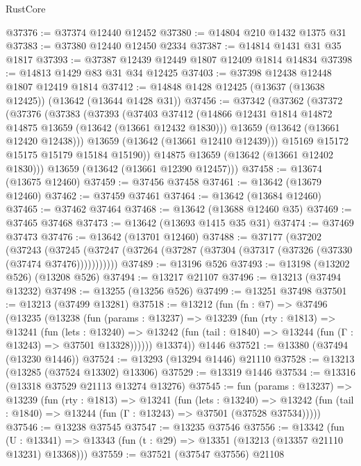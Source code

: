\begin{lexlean}{RustCore}
\begin{coremodule}
@37376 := @37374 @12440 @12452
@37380 := @14804 @210 @1432 @1375 @31
@37383 := @37380 @12440 @12450 @2334
@37387 := @14814 @1431 @31 @35 @1817
@37393 := @37387 @12439 @12449 @1807 @12409 @1814 @14834
@37398 := @14813 @1429 @83 @31 @34 @12425
@37403 := @37398 @12438 @12448 @1807 @12419 @1814
@37412 := @14848 @1428 @12425 (@13637 (@13638 @12425)) (@13642 (@13644 @1428 @31))
@37456 := @37342
    (@37362
      (@37372
        (@37376
          (@37383
            (@37393
              (@37403
                @37412
                (@14866 @12431 @1814 @14872 @14875 @13659 (@13642 (@13661 @12432 @1830)))
                @13659
                (@13642 (@13661 @12420 @12438)))
              @13659
              (@13642 (@13661 @12410 @12439)))
            @15169
            @15172
            @15175
            @15179
            @15184
            @15190))
        @14875
        @13659
        (@13642 (@13661 @12402 @1830)))
      @13659
      (@13642 (@13661 @12390 @12457)))
@37458 := @13674 (@13675 @12460)
@37459 := @37456 @37458
@37461 := @13642 (@13679 @12460)
@37462 := @37459 @37461
@37464 := @13642 (@13684 @12460)
@37465 := @37462 @37464
@37468 := @13642 (@13688 @12460 @35)
@37469 := @37465 @37468
@37473 := @13642 (@13693 @1415 @35 @31)
@37474 := @37469 @37473
@37476 := @13642 (@13701 @12460)
@37488 := @37177
    (@37202
      (@37243
        (@37245 (@37247 (@37264 (@37287 (@37304 (@37317 (@37326 (@37330 (@37474 @37476)))))))))))
@37489 := @13196 @526
@37493 := @13198 (@13202 @526) (@13208 @526)
@37494 := @13217 @21107
@37496 := @13213 (@37494 @13232)
@37498 := @13255 (@13256 @526)
@37499 := @13251 @37498
@37501 := @13213 (@37499 @13281)
@37518 := @13212
    (fun (fn : @7) =>
    @37496
      (@13235
        (@13238
          (fun (params : @13237) =>
          @13239
            (fun (rty : @1813) =>
            @13241
              (fun (lets : @13240) =>
              @13242 (fun (tail : @1840) => @13244 (fun (Γ : @13243) => @37501 @13328))))))
        @13374))
    @1446
@37521 := @13380 (@37494 (@13230 @1446))
@37524 := @13293 (@13294 @1446) @21110
@37528 := @13213 (@13285 (@37524 @13302) @13306)
@37529 := @13319 @1446
@37534 := @13316 (@13318 @37529 @21113 @13274 @13276)
@37545 := fun (params : @13237) =>
  @13239
    (fun (rty : @1813) =>
    @13241
      (fun (lets : @13240) =>
      @13242 (fun (tail : @1840) => @13244 (fun (Γ : @13243) => @37501 (@37528 @37534)))))
@37546 := @13238 @37545
@37547 := @13235 @37546
@37556 := @13342
    (fun (U : @13341) => @13343 (fun (t : @29) => @13351 (@13213 (@13357 @21110 @13231) @13368)))
@37559 := @37521 (@37547 @37556) @21108

\end{coremodule}
\end{lexlean}
